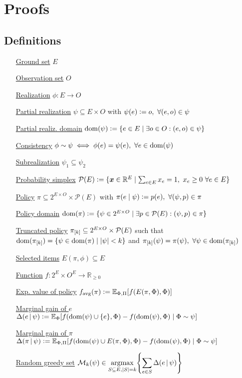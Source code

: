 ﻿\appendix
\chapter{Proofs}

\section{Definitions}

\begin{itemize}
  \item[\underline{Ground set}] $E$
  \item[\underline{Observation set}] $O$
  \item[\underline{Realization}] $\phi : E \to O$
  \item[\underline{Partial realization}] $\psi \subseteq E \times O$ with $\psi(e) \vcentcolon= o,\ \forall (e, o) \in \psi$
  \item[\underline{Partial realiz. domain}] $\operatorname{dom}(\psi) \vcentcolon= \{e \in E \mid \exists o \in O : (e, o) \in \psi\}$
  \item[\underline{Consistency}] $\phi \sim \psi \iff \phi(e) = \psi(e),\ \forall e \in \operatorname{dom}(\psi)$
  \item[\underline{Subrealization}] $\psi_1 \subseteq \psi_2$
  \item[\underline{Probability simplex}] $\mathcal{P}(E) \vcentcolon= \{\bm{x} \in \mathbb{R}^E \mid \sum_{e \in E} x_e = 1,\ x_e \geq 0\ \forall e \in E\}$
  \item[\underline{Policy}] $\pi \subseteq 2^{E \times O} \times \mathcal{P}(E)$ with $\pi(e\mid\psi) \vcentcolon= p(e),\ \forall (\psi, p) \in \pi$
  \item[\underline{Policy domain}] $\operatorname{dom}(\pi) \vcentcolon= \{\psi \in 2^{E \times O} \mid \exists p \in \mathcal{P}(E) : (\psi, p) \in \pi\}$
  \item[\underline{Truncated policy}] $\pi_{[k]} \subseteq 2^{E \times O} \times \mathcal{P}(E)$ such that $\operatorname{dom}(\pi_{[k]}) = \{\psi \in \operatorname{dom}(\pi) \mid |\psi| < k\}$ and $\pi_{[k]}(\psi) = \pi(\psi),\ \forall \psi \in \operatorname{dom}(\pi_{[k]})$
  \item[\underline{Selected items}] $E(\pi, \phi) \subseteq E$
  \item[\underline{Function}] $f : 2^E \times O^E \to \mathbb{R}_{\geq 0}$
  \item[\underline{Exp. value of policy}] $f_{\mathrm{avg}}(\pi) \vcentcolon= \mathbb{E}_{\Phi, \Pi}[f(E(\pi, \Phi), \Phi)]$
  \item[\underline{Marginal gain of $e$}] $\Delta(e\,\vert\,\psi) \vcentcolon= \mathbb{E}_{\Phi}[f(\operatorname{dom}(\psi) \cup \{e\}, \Phi) - f(\operatorname{dom}(\psi), \Phi) \mid \Phi \sim \psi]$
  \item[\underline{Marginal gain of $\pi$}] $\Delta(\pi\,\vert\,\psi) \vcentcolon= \mathbb{E}_{\Phi, \Pi}[f(\operatorname{dom}(\psi) \cup E(\pi, \Phi), \Phi) - f(\operatorname{dom}(\psi), \Phi) \mid \Phi \sim \psi]$
  \item[\underline{Random greedy set}] $\mathcal{M}_k(\psi) \in \displaystyle\argmax_{S \subseteq E, |S| = k}\left\{\sum_{e \in S} \D(e\mmid\psi) \right\}$
\end{itemize}


